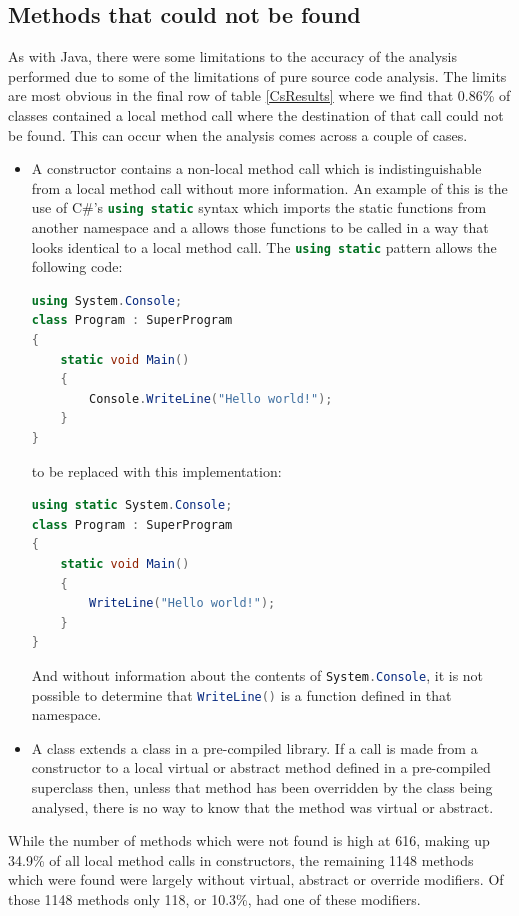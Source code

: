 \documentclass[11pt
              , a4paper
              , twoside
              , openright
              ]{report}
\newcommand{\cs}[1]{\lstinline[language=cs]{#1}}
\begin{document}
\subsection{Methods that could not be found}
\label{MethodNotFound}
As with Java, there were some limitations to the accuracy of the analysis performed due to some of the limitations of pure source code analysis. The limits are most obvious in the final row of table \ref{CsResults} where we find that 0.86\% of classes contained a local method call where the destination of that call could not be found. This can occur when the analysis comes across a couple of cases.
\begin{itemize}
	\item A constructor contains a non-local method call which is indistinguishable from a local method call without more information. An example of this is the use of C\#'s \cs{using static} syntax which imports the static functions from another namespace and a allows those functions to be called in a way that looks identical to a local method call. The \cs{using static} pattern allows the following code:
	\begin{lstlisting}[language=cs]
using System.Console;
class Program : SuperProgram
{ 
	static void Main() 
	{ 
		Console.WriteLine("Hello world!"); 
	} 
}
	\end{lstlisting}
	to be replaced with this implementation:
	\begin{lstlisting}[language=cs]
using static System.Console;
class Program : SuperProgram
{ 
	static void Main() 
	{ 
		WriteLine("Hello world!"); 
	} 
}
	\end{lstlisting}
	And without information about the contents of \cs{System.Console}, it is not possible to determine that \cs{WriteLine()} is a function defined in that namespace.
	\item A class extends a class in a pre-compiled library. If a call is made from a constructor to a local virtual or abstract method defined in a pre-compiled superclass then, unless that method has been overridden by the class being analysed, there is no way to know that the method was virtual or abstract.
\end{itemize}
While the number of methods which were not found is high at 616, making up 34.9\% of all local method calls in constructors, the remaining 1148 methods which were found were largely without virtual, abstract or override modifiers. Of those 1148 methods only 118, or 10.3\%, had one of these modifiers.
\end{document}
